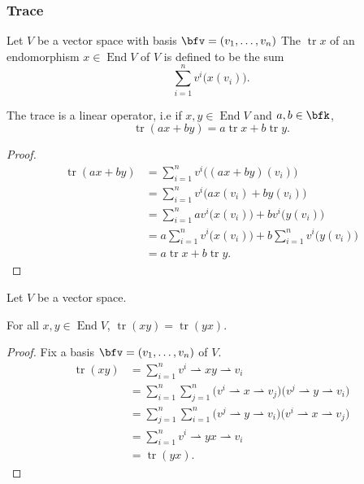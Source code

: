 \documentclass{article}
\DeclareMathOperator{\End}{End}
\DeclareMathOperator{\tr}{tr}
\begin{document}
\subsubsection{Trace}

\begin{definition}
    Let $V$ be a vector space with basis $\bfv = (v_1,\ldots,v_n)$
    The  $\tr x$ of an endomorphism $x \in \End V$ of $V$ is defined to be the sum
    \[
        \sum_{i=1}^n 
        v^i\Big(x(v_i)\Big).
    \]
\end{definition}

\begin{theorem}
    The trace is a linear operator, i.e if $x, y \in \End V$ and $a,b \in \bfk$,
    \[
        \tr(ax + by)
        =
        a\tr x + b \tr y.
    \]
\end{theorem}
\begin{proof}
    \begin{align*}
        \tr (ax + by)
        &=
        \sum_{i=1}^n 
        v^i\Big((ax + by)(v_i)\Big)
        \\
        &=
        \sum_{i=1}^n 
        v^i\Big(ax(v_i) + by(v_i)\Big)
        \\
        &=
        \sum_{i=1}^n 
        av^i\Big(x(v_i)\Big)
        + bv^i\Big(y(v_i)\Big)
        \\
        &=
        a
        \sum_{i=1}^n 
        v^i\Big(x(v_i)\Big)
        + 
        b
        \sum_{i=1}^n 
        v^i\Big(y(v_i)\Big)
        \\
        &=
        a \tr x + b \tr y.
    \end{align*}
\end{proof}

\begin{theorem}
    Let $V$ be a vector space.

    For all $x, y \in \End V$, $\tr(xy) = \tr(yx)$.
\end{theorem}

\begin{proof}
    Fix a basis $\bfv = (v_1, \ldots, v_n)$ of $V$.
    \begin{align*}
        \tr (xy)
        &=
        \sum_{i=1}^n 
        v^i \rightharpoonup xy \rightharpoonup v_i
        \\
        &=
        \sum_{i=1}^n 
        \sum_{j=1}^n
        \Big(
            v^i \rightharpoonup x \rightharpoonup v_j
        \Big) 
        \Big(
            v^j \rightharpoonup y \rightharpoonup v_i
        \Big)
        \\
        &=
        \sum_{j=1}^n
        \sum_{i=1}^n 
        \Big(
            v^j \rightharpoonup y \rightharpoonup v_i
        \Big)
        \Big(
            v^i \rightharpoonup x \rightharpoonup v_j
        \Big) 
        \\
        &=
        \sum_{i=1}^n 
        v^i \rightharpoonup yx \rightharpoonup v_i
        \\
        &=
        \tr (yx).
    \end{align*}
\end{proof}
\end{document}
